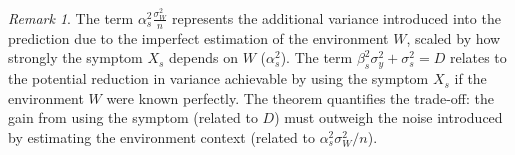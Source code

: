 \documentclass{article}
\theoremstyle{definition}
\theoremstyle{remark}
\newtheorem{remark}[theorem]{Remark}
\begin{document}
\begin{remark}
The term $\alpha_s^2 \frac{\sigma_W^2}{n}$ represents the additional variance introduced into the prediction due to the imperfect estimation of the environment $W$, scaled by how strongly the symptom $X_s$ depends on $W$ ($\alpha_s^2$). The term $\beta_s^2 \sigma_y^2 + \sigma_s^2 = D$ relates to the potential reduction in variance achievable by using the symptom $X_s$ if the environment $W$ were known perfectly. The theorem quantifies the trade-off: the gain from using the symptom (related to $D$) must outweigh the noise introduced by estimating the environment context (related to $\alpha_s^2 \sigma_W^2 / n$).
\end{remark}
\end{document}
